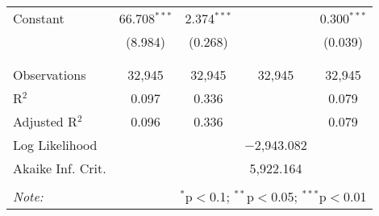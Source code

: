 \documentclass[]{article}
\begin{document}
\begin{table}[!htbp]
\begin{tabular}{@{\extracolsep{5pt}}lcccc}
 Constant & 66.708$^{***}$ & 2.374$^{***}$ && 0.300$^{***}$ \\ 
  & (8.984) & (0.268) && (0.039) \\ 
  & & & & \\ 
\hline \\[-1.8ex] 
Observations & 32,945 & 32,945 & 32,945 & 32,945 \\ 
R$^{2}$ & 0.097 & 0.336 & & 0.079 \\ 
Adjusted R$^{2}$ & 0.096 & 0.336 &  & 0.079 \\ 
Log Likelihood &  &  & $-$2,943.082 &  \\ 
Akaike Inf. Crit. &  &  & 5,922.164 &  \\ 
\hline 
\hline \\[-1.8ex] 
\textit{Note:}  & \multicolumn{4}{r}{$^{*}$p$<$0.1; $^{**}$p$<$0.05; $^{***}$p$<$0.01} \\ 
\end{tabular} 
\end{table}
\end{document}
